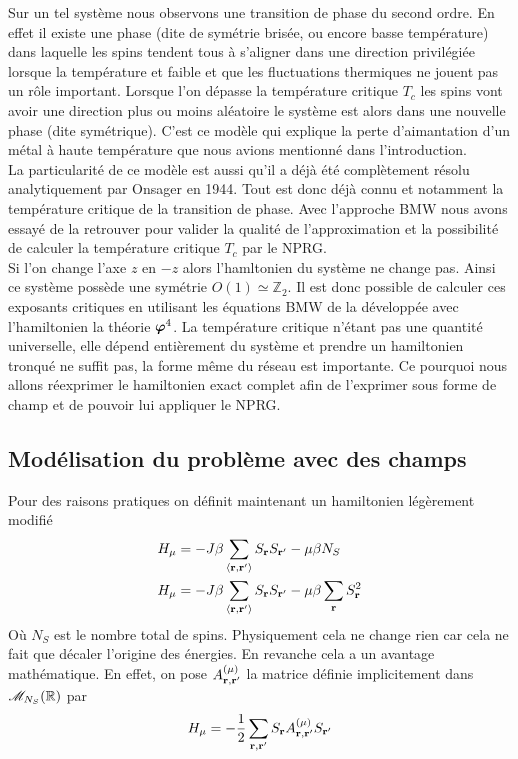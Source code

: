 \documentclass[10pt]{article}
\begin{document}
\begin{multicols}{2}
Sur un tel système nous observons une transition de phase du second ordre. En effet il existe une phase (dite de symétrie brisée, ou encore basse température) dans laquelle les spins tendent tous à s'aligner dans une direction privilégiée lorsque la température et faible et que les fluctuations thermiques ne jouent pas un rôle important. Lorsque l'on dépasse la température critique $T_c$ les spins vont avoir une direction plus ou moins aléatoire le système est alors dans une nouvelle phase (dite symétrique). C'est ce modèle qui explique la perte d'aimantation d'un métal à haute température que nous avions mentionné dans l'introduction. \\

La particularité de ce modèle est aussi qu'il a déjà été complètement résolu analytiquement par Onsager \cite{Onsager} en 1944. Tout est donc déjà connu et notamment la température critique de la transition de phase. Avec l'approche BMW nous avons essayé de la retrouver pour valider la qualité de l'approximation et la possibilité de calculer la température critique $T_c$ par le NPRG. \\

Si l'on change l'axe $z$ en $-z$ alors l'hamltonien du système ne change pas. Ainsi ce système possède une symétrie $O(1) \simeq \mathbb{Z}_2$. Il est donc possible de calculer ces exposants critiques en utilisant les équations BMW de la  développée avec l'hamiltonien la théorie $\boldsymbol{ \varphi}^4$. La température critique n'étant pas une quantité universelle, elle dépend entièrement du système et prendre un hamiltonien tronqué ne suffit pas, la forme même du réseau est importante. Ce pourquoi nous allons réexprimer le hamiltonien exact complet  afin de l'exprimer sous forme de champ et de pouvoir lui appliquer le NPRG. 
\vspace*{11pt} 

\subsection{Modélisation du problème avec des champs}

Pour des raisons pratiques on définit maintenant un hamiltonien légèrement modifié
\begin{align}
  H_\mu &= -J\beta \sum_{\left<{\bf r}, {\bf r}'\right>}S_{\bf r} S_{{\bf r}'} - \mu \beta N_S \\
  H_\mu  &= -J\beta \sum_{\left<{\bf r}, {\bf r}'\right>}S_{\bf r} S_{{\bf r}'} - \mu \beta \sum_{\bf r} S_{\bf r}^2 
\end{align}
Où $N_S$ est le nombre total de spins. Physiquement cela ne change rien car cela ne fait que décaler l'origine des énergies. En revanche cela a un avantage mathématique. En effet, on pose $A_{{\bf r}, {\bf r}'}^{(\mu)}$ la matrice définie implicitement dans $\mathscr{M}_{N_S}(\mathbb{R})$ par
\begin{equation}
  H_\mu  = -\frac{1}{2} \sum_{{\bf r}, {\bf r}'} S_{\bf r} A_{{\bf r}, {\bf r}'}^{(\mu)}S_{{\bf r}'}
\end{equation}


\end{multicols}
\end{document}
